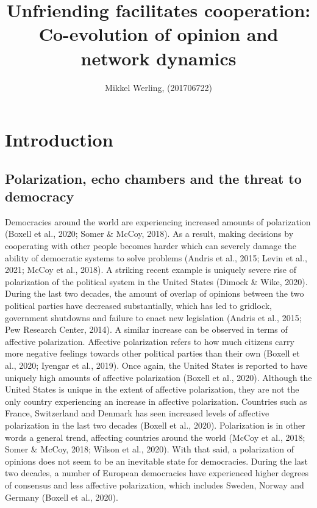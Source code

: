 \documentclass{article}
\title{Unfriending facilitates cooperation: \\Co-evolution of opinion and network dynamics}
\author{Mikkel Werling, (201706722)}
\date{}
\begin{document}
\maketitle
\tableofcontents

\section{Introduction}

\subsection{Polarization, echo chambers and the threat to democracy}

Democracies around the world are experiencing increased amounts of polarization (Boxell et al., 2020; Somer \& McCoy, 2018). As a result, making decisions by cooperating with other people becomes harder which can severely damage the ability of democratic systems to solve problems (Andris et al., 2015; Levin et al., 2021; McCoy et al., 2018). A striking recent example is uniquely severe rise of polarization of the political system in the United States (Dimock \& Wike, 2020). During the last two decades, the amount of overlap of opinions between the two political parties have decreased substantially, which has led to gridlock, government shutdowns and failure to enact new legislation (Andris et al., 2015; Pew Research Center, 2014). A similar increase can be observed in terms of affective polarization. Affective polarization refers to how much citizens carry more negative feelings towards other political parties than their own (Boxell et al., 2020; Iyengar et al., 2019). Once again, the United States is reported to have uniquely high amounts of affective polarization (Boxell et al., 2020). Although the United States is unique in the extent of affective polarization, they are not the only country experiencing an increase in affective polarization. Countries such as France, Switzerland and Denmark has seen increased levels of affective polarization in the last two decades (Boxell et al., 2020). Polarization is in other words a general trend, affecting countries around the world (McCoy et al., 2018; Somer \& McCoy, 2018; Wilson et al., 2020). With that said, a polarization of opinions does not seem to be an inevitable state for democracies. During the last two decades, a number of European democracies have experienced higher degrees of consensus and less affective polarization, which includes Sweden, Norway and Germany (Boxell et al., 2020). 
\end{document}

